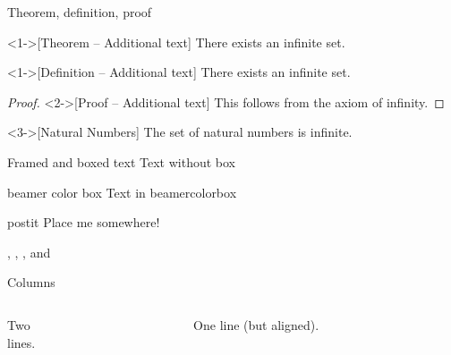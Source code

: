 \begin{frame}{Theorem, definition, proof}
  \begin{theorem}<1->[Theorem -- Additional text]
  There exists an infinite set.
  \end{theorem}
  \begin{definition}<1->[Definition -- Additional text]
  There exists an infinite set.
  \end{definition}
  \begin{proof}<2->[Proof -- Additional text]
  This follows from the axiom of infinity.
  \end{proof}
  \begin{example}<3->[Natural Numbers]
  The set of natural numbers is infinite.
  \end{example}
\end{frame}




\begin{frame}{Framed and boxed text}
  Text without box
  \begin{beamercolorbox}{beamer color box}
    Text in beamercolorbox
  \end{beamercolorbox}
  
  \begin{beamercolorbox}[sep=1em,wd=5cm]{postit}
    Place me somewhere!
  \end{beamercolorbox}
  
  , , , and 
\end{frame}


\begin{frame}{Columns}
  \begin{columns}[t]
    \begin{column}{5cm}
    Two\\lines.
    \end{column}
    \begin{column}{5cm}
    One line (but aligned).
    \end{column}
  \end{columns}
\end{frame}


